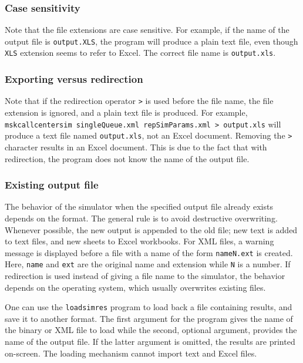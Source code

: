 \subsubsection{Case sensitivity}

Note that the file extensions are case sensitive.
For example, if the name of the output file is
\texttt{output.XLS}, the program will produce a plain text file, even
though \texttt{XLS} extension seems to refer to Excel.
The correct file name is \texttt{output.xls}.

\subsubsection{Exporting versus redirection}

Note that if the redirection operator \texttt{>} is used before the
file name, the file extension is ignored, and a plain text file is
produced.
For example, \texttt{mskcallcentersim singleQueue.xml repSimParams.xml
> output.xls} will produce a text file named \texttt{output.xls}, not
an Excel document.
Removing the \texttt{>} character results in an Excel document.
This is due to the fact that with redirection, the program does not
know the name of the output file.

\subsubsection{Existing output file}

The behavior of the simulator when the specified output file already
exists depends on the format.
The general rule is to avoid destructive overwriting.
Whenever possible, the new output is appended to the old file;
new text is added to text files, and new sheets to Excel workbooks.
For XML files, a warning message is displayed before a file
with a name of the form \texttt{nameN.ext} is created.
Here, \texttt{name} and \texttt{ext} are the original name and
extension while \texttt{N} is a number.
If redirection is used instead of giving a file name to the simulator,
the behavior depends on the operating system, which usually overwrites
existing files.

One can use the \texttt{loadsimres} program to load back a file
containing results, and save it to another format.
The first argument for the program gives the
name of the binary or XML file to load while the second,
optional argument, provides the name of the output file.
If the latter argument is omitted, the results are printed on-screen.
The loading mechanism cannot import text and Excel files.

